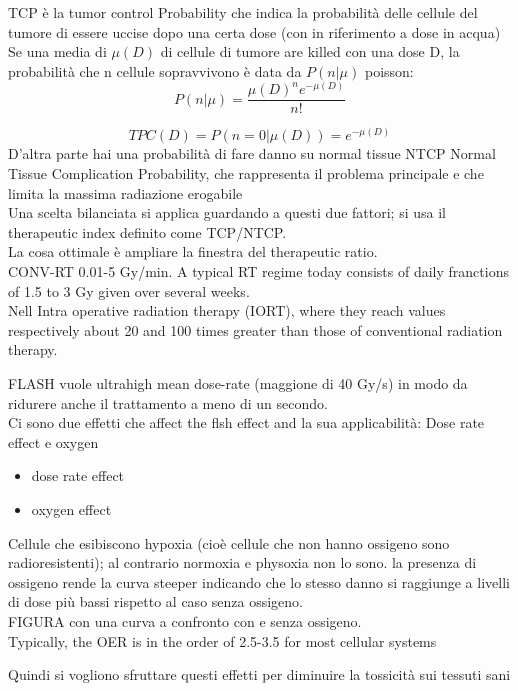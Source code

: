     TCP è la tumor control Probability che indica la probabilità delle cellule del tumore di essere uccise dopo una certa dose (con in riferimento a dose in acqua)\\
    Se una media di $\mu(D)$ di cellule di tumore are killed con una dose D, la probabilità che n cellule sopravvivono è data da $P(n|\mu)$ poisson:
    \begin{equation}
        P(n|\mu) = \frac{\mu(D)^ne^{-\mu(D)}}{n!}
    \end{equation}    

    \begin{equation}
        TPC(D) = P(n=0|\mu(D))= e^{-\mu(D)}
    \end{equation} 
    D'altra parte hai una probabilità di fare danno su normal tissue NTCP Normal Tissue Complication Probability, che rappresenta il problema principale e che limita la massima radiazione erogabile\\
    Una scelta bilanciata si applica guardando a questi due fattori; si usa il therapeutic index definito come TCP/NTCP.\\
    La cosa ottimale è ampliare la finestra del therapeutic ratio.\\


    CONV-RT 0.01-5 Gy/min. A typical RT regime today consists of daily franctions of 1.5 to 3 Gy given over several weeks.\\
    Nell Intra operative radiation therapy (IORT), where they reach values respectively about
    20 and 100 times greater than those of conventional radiation therapy.

    FLASH vuole ultrahigh mean dose-rate (maggione di 40 Gy/s) in modo da ridurere anche il trattamento a meno di un secondo. \\


    Ci sono due effetti che affect the flsh effect and la sua applicabilità: Dose rate effect e oxygen\\
    \begin{itemize}
        \item dose rate effect
        \item oxygen effect
    \end{itemize}    

    Cellule che esibiscono hypoxia (cioè cellule che non hanno ossigeno sono radioresistenti); al contrario normoxia e physoxia non lo sono.
    la presenza di ossigeno rende la curva steeper indicando che lo stesso danno si raggiunge a livelli di dose più bassi rispetto al caso senza ossigeno.\\
    FIGURA con una curva a confronto con e senza ossigeno.\\
    Typically, the OER is in the order of 2.5-3.5 for most cellular systems


    Quindi si vogliono sfruttare questi effetti per diminuire la tossicità sui tessuti sani\\




